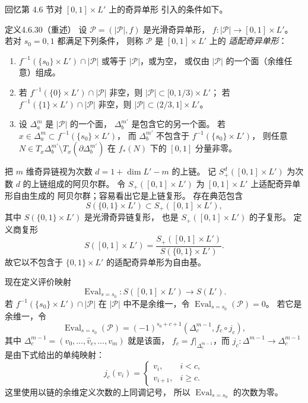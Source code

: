 回忆第 4.6 节对 $[0,1]\times L'$ 上的奇异单形
引入的条件如下。
\begin{statement}{定义}{4.6.30（重述）}
设 $\mathcal P=(|\mathcal P|,f)$ 是光滑奇异单形，
$f\colon|\mathcal P|\to[0,1]\times L'$。
若对 $s_0=0,1$ 都满足下列条件，
则称 $\mathcal P$ 是 $[0,1]\times L'$ 上的
\emph{适配奇异单形}：%
\begin{enumerate}[label=\textup{(4.6.31.\arabic*)},leftmargin=5.9em]
 \item $f^{-1}(\{s_0\}\times L')\cap|\mathcal P|$
 或等于 $|\mathcal P|$，或为空，
 或仅由 $|\mathcal P|$ 的一个面（余维任意）组成。
 \item 若 $f^{-1}(\{0\}\times L')\cap|\mathcal P|$
 非空，则
 $|\mathcal P|\subset[0,1/3)\times L'$；
 若 $f^{-1}(\{1\}\times L')\cap|\mathcal P|$
 非空，则
 $|\mathcal P|\subset(2/3,1]\times L'$。
 \item 设 $\Delta_a^m$ 是 $|\mathcal P|$ 的一个面，
 $\Delta_b^{m'}$ 是包含它的另一个面。
 若 $x\in\Delta_a^m\subset
 f^{-1}(\{s_0\}\times L')$，
 而 $\Delta_b^{m'}$ 不包含于
 $f^{-1}(\{s_0\}\times L')$，
 则任意
 $N\in T_x\Delta_b^{m'}\setminus
 T_x(\partial\Delta_b^{m'})$
 在 $f_*(N)$ 下的 $[0,1]$ 分量非零。
\end{enumerate}
\end{statement}

把 $m$ 维奇异链视为次数
$d=1+\dim L'-m$ 的上链。
记 $S_+^d([0,1]\times L')$ 为次数 $d$
的上链组成的阿贝尔群。
令 $S_+([0,1]\times L')$ 为
$[0,1]\times L'$ 上适配奇异单形自由生成的
阿贝尔群；容易看出它是上链复形。
存在典范包含
\[
S(\{0,1\}\times L')\subset S_+([0,1]\times L'),
\]
其中 $S(\{0,1\}\times L')$ 是光滑奇异链复形，
也是 $S_+([0,1]\times L')$ 的子复形。
定义商复形
\[
S([0,1]\times L')
=\frac{S_+([0,1]\times L')}
{S(\{0,1\}\times L')}.
\]
故它以不包含于 $\{0,1\}\times L'$
的适配奇异单形为自由基。

现在定义评价映射
\[
\operatorname{Eval}_{s=s_0}\colon
S([0,1]\times L')\longrightarrow S(L').
\]
若 $f^{-1}(\{s_0\}\times L')\cap|\mathcal P|$
在 $|\mathcal P|$ 中不是余维一，令
$\operatorname{Eval}_{s=s_0}(\mathcal P)=0$。
若它是余维一，令
\[
\operatorname{Eval}_{s=s_0}(\mathcal P)
=(-1)^{s_0+c+1}
(\Delta_c^{m-1},f_c\circ j_c),
\]
其中
$\Delta_c^{m-1}=(v_0,\ldots,\widehat v_c,\ldots,v_m)$
就是该面，
$f_c=f|_{\Delta_c^{m-1}}$，而
$j_c\colon\Delta^{m-1}\to\Delta_c^{m-1}$
是由下式给出的单纯映射：
\[
j_c(v_i)=
\begin{cases}
v_i,&i<c,\\
v_{i+1},&i\ge c.
\end{cases}
\]
这里使用以链的余维定义次数的上同调记号，
所以 $\operatorname{Eval}_{s=s_0}$ 的次数为零。

